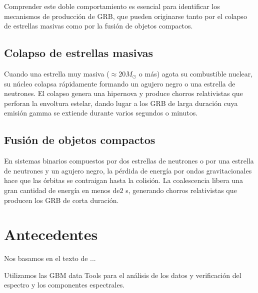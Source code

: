 \documentclass[final,5p,times,twocolumn,authoryear]{elsarticle}
\newcommand{\kms}{km\,s$^{-1}$}
\begin{document}
Comprender este doble comportamiento es esencial para identificar los
mecanismos de producción de GRB, que pueden originarse tanto por el
colapso de estrellas masivas como por la fusión de objetos compactos.

\subsection{Colapso de estrellas masivas}
Cuando una estrella muy masiva ($≈ 20 M_{\odot}$ o más) agota su combustible
nuclear, su núcleo colapsa rápidamente formando un agujero negro o una
estrella de neutrones. El colapso genera una hipernova y produce chorros
relativistas que perforan la envoltura estelar, dando lugar a los GRB de
larga duración cuya emisión gamma se extiende durante varios segundos o
minutos.

\subsection{Fusión de objetos compactos}
En sistemas binarios compuestos por dos estrellas de neutrones o por una
estrella de neutrones y un agujero negro, la pérdida de energía por ondas
gravitacionales hace que las órbitas se contraigan hasta la colisión.
La coalescencia libera una gran cantidad de energía en menos de$ 2 $ s,
generando chorros relativistas que producen los GRB de corta duración.

\section{Antecedentes}
\label{antecedentes}
Nos basamos en el texto de \citep{ackermann2011}...

Utilizamos las GBM data Tools \citep{GDT-Fermi} para el análisis de los datos y verificación del espectro y los componentes espectrales.

\end{document}
